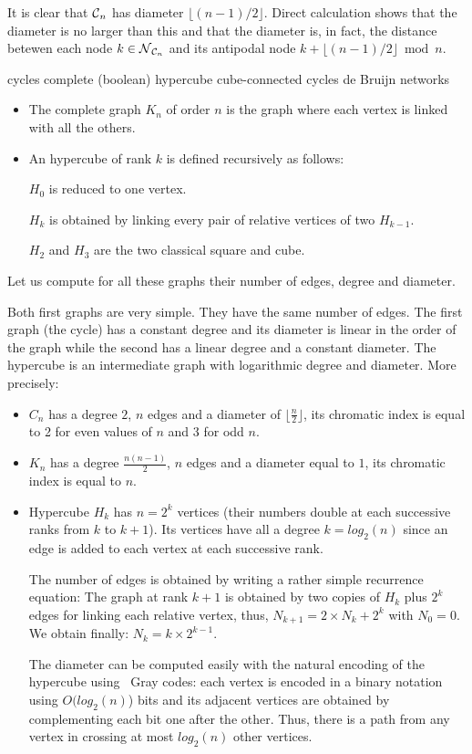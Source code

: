\noindent
It is clear that $\mbox{$\cal C$}_n$ has diameter $\lfloor (n-1)/2 \rfloor$.
Direct calculation shows that the diameter is no larger than this and
that the diameter is, in fact, the distance betewen each node $k \in
\mbox{$\cal N$}_{{\cal C}_n}$ and its antipodal node $k + \lfloor (n-1)/2 \rfloor
\bmod n$.



cycles
complete
(boolean) hypercube
cube-connected cycles
de Bruijn networks

\bigskip

\begin{itemize}
\item The complete graph $K_n$ of order $n$ is the graph where each vertex is linked with all the others. 
\item An hypercube of rank $k$ is defined recursively as follows:

$H_0$ is reduced to one vertex.

$H_k$ is obtained by linking every pair of relative vertices of two $H_{k-1}$.

$H_2$ and $H_3$ are the two classical square and cube.
\end{itemize}

Let us compute for all these graphs their number of edges, degree and diameter.

Both first graphs are very simple. 
They have the same number of edges. 
The first graph (the cycle) has a constant degree and its diameter is linear in the order of the graph while the second has 
a linear degree and a constant diameter. The hypercube is an intermediate graph with logarithmic degree and diameter.
More precisely:

\begin{itemize}
\item
$C_n$ has a degree $2$, $n$ edges and a diameter of $\lfloor \frac{n}{2} \rfloor$, its chromatic index is equal to 2 for even values of $n$ and $3$ for odd $n$.
\item
$K_n$ has a degree $\frac{n(n-1)}{2}$, $n$ edges and a diameter equal to $1$, its chromatic index is equal to $n$. 
\item
Hypercube $H_k$ has $n=2^k$ vertices (their numbers double at each successive ranks from $k$ to $k+1$).
Its vertices have all a degree $k=log_2(n)$ since an edge is added to each vertex at each successive rank.

The number of edges is obtained by writing a rather simple recurrence equation: The graph at rank $k+1$ is obtained by two copies of $H_k$
plus $2^k$ edges for linking each relative vertex, thus,
$N_{k+1} = 2 \times N_k + 2^k$ with $N_0 = 0$.
We obtain finally: $N_k = k \times 2^{k-1}$. 

The diameter can be computed easily with the natural encoding of the hypercube using {\ Gray} codes:
each vertex is encoded in a binary notation using $O(log_2(n)$) bits and its adjacent vertices are obtained by complementing each bit one after the other.
Thus, there is a path from any vertex in crossing at most $log_2(n)$ other vertices.
\end{itemize}

